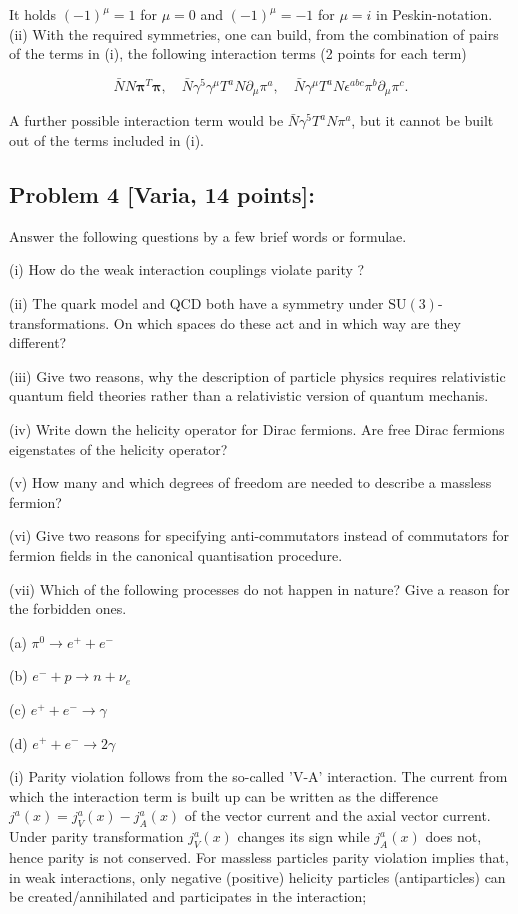 \documentclass[10pt, letterpaper]{article}
\begin{document}
It holds $(-1)^\mu=1$ for $\mu=0$ and $(-1)^\mu=-1$ for $\mu=i$ in Peskin-notation.
(ii) With the required symmetries, one can build, from the combination of pairs of the terms in (i), the following interaction terms (2 points for each term)

$$
\bar{N} N \boldsymbol{\pi}^T \boldsymbol{\pi}, \quad \bar{N} \gamma^5 \gamma^\mu T^a N \partial_\mu \pi^a, \quad \bar{N} \gamma^\mu T^a N \epsilon^{a b c} \pi^b \partial_\mu \pi^c .
$$


A further possible interaction term would be $\bar{N} \gamma^5 T^a N \pi^a$, but it cannot be built out of the terms included in (i).


\subsection{Problem 4 [Varia, 14 points]:}

Answer the following questions by a few brief words or formulae.

(i) How do the weak interaction couplings violate parity ?

(ii) The quark model and QCD both have a symmetry under $\mathrm{SU}(3)$-transformations. On which spaces do these act and in which way are they different?

(iii) Give two reasons, why the description of particle physics requires relativistic quantum field theories rather than a relativistic version of quantum mechanis.

(iv) Write down the helicity operator for Dirac fermions. Are free Dirac fermions eigenstates of the helicity operator?

(v) How many and which degrees of freedom are needed to describe a massless fermion?

(vi) Give two reasons for specifying anti-commutators instead of commutators for fermion fields in the canonical quantisation procedure.

(vii) Which of the following processes do not happen in nature? Give a reason for the forbidden ones.

(a) $\pi^0 \rightarrow e^{+}+e^{-}$

(b) $e^{-}+p \rightarrow n+\nu_e$

(c) $e^{+}+e^{-} \rightarrow \gamma$

(d) $e^{+}+e^{-} \rightarrow 2 \gamma$


(i) Parity violation follows from the so-called 'V-A' interaction. The current from which the interaction term is built up can be written as the difference $j^a(x)=j_V^a(x)-j_A^a(x)$ of the vector current and the axial vector current. Under parity transformation $j_V^a(x)$ changes its sign while $j_A^a(x)$ does not, hence parity is not conserved. For massless particles parity violation implies that, in weak interactions, only negative (positive) helicity particles (antiparticles) can be created/annihilated and participates in the interaction;
\end{document}
